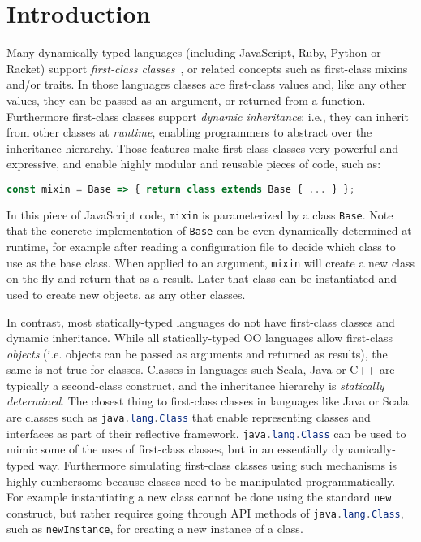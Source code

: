 \section{Introduction}
\label{sec:intro}

Many dynamically typed-languages (including JavaScript, Ruby, Python
or Racket) support \emph{first-class classes}~\cite{DBLP:conf/aplas/FlattFF06}, or related concepts
such as first-class mixins and/or traits. In those languages classes
are first-class values and, like any other values, they can be
passed as an argument, or returned from a function. Furthermore
first-class classes support \emph{dynamic inheritance}: i.e., they
can inherit from other classes at \emph{runtime}, enabling
programmers to abstract over the inheritance hierarchy. 
Those features make first-class classes very powerful and expressive,
and enable highly modular and reusable pieces of code, such as:
\begin{lstlisting}[language=JavaScript]
const mixin = Base => { return class extends Base { ... } };
\end{lstlisting}
In this piece of JavaScript code, \lstinline{mixin} is
parameterized by a class \lstinline{Base}. Note that the concrete
implementation of \lstinline{Base} can be 
even dynamically determined at runtime, for example 
after reading a configuration file to decide which 
class to use as the base class.  When applied to an argument, 
\lstinline{mixin} will create a new class on-the-fly and return that
as a result. Later that class can be instantiated and used to create 
new objects, as any other classes.

In contrast, most statically-typed
languages do not have first-class classes and dynamic
inheritance. While all statically-typed OO languages allow first-class
\emph{objects} (i.e. objects can be passed as arguments and returned
as results), the same is not true for classes. Classes in languages such
Scala, Java or C++ are typically a second-class construct, and the
inheritance hierarchy is \emph{statically determined}. The closest thing
to first-class classes in 
languages like Java or Scala are classes such as 
\lstinline[language=java]{java.lang.Class} that enable representing classes and
interfaces as part of their reflective framework. \lstinline[language=java]{java.lang.Class} can be used to
mimic some of the uses of first-class classes, but in an essentially
dynamically-typed way. Furthermore simulating first-class classes
using such mechanisms is highly cumbersome because classes need to be
manipulated programmatically. For example instantiating a new class
cannot be done using the standard \lstinline{new} construct, but
rather requires going through API methods of
\lstinline[language=java]{java.lang.Class}, such as \lstinline{newInstance}, for
creating a new instance of a class.


